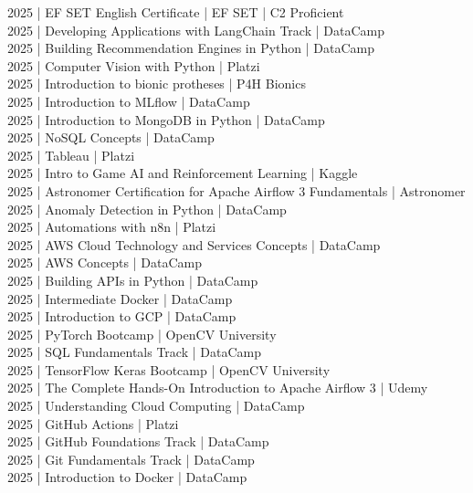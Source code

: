 {
2025 | EF SET English Certificate | EF SET | C2 Proficient \\
2025 | Developing Applications with LangChain Track | DataCamp \\
2025 | Building Recommendation Engines in Python | DataCamp \\
2025 | Computer Vision with Python | Platzi \\
2025 | Introduction to bionic protheses | P4H Bionics \\
2025 | Introduction to MLflow | DataCamp \\
2025 | Introduction to MongoDB in Python | DataCamp \\
2025 | NoSQL Concepts | DataCamp \\
2025 | Tableau | Platzi \\
2025 | Intro to Game AI and Reinforcement Learning | Kaggle \\
2025 | Astronomer Certification for Apache Airflow 3 Fundamentals | Astronomer \\
2025 | Anomaly Detection in Python | DataCamp \\
2025 | Automations with n8n | Platzi \\
2025 | AWS Cloud Technology and Services Concepts | DataCamp \\
2025 | AWS Concepts | DataCamp \\
2025 | Building APIs in Python | DataCamp \\
2025 | Intermediate Docker | DataCamp \\
2025 | Introduction to GCP | DataCamp \\
2025 | PyTorch Bootcamp | OpenCV University \\
2025 | SQL Fundamentals Track | DataCamp \\
2025 | TensorFlow Keras Bootcamp | OpenCV University \\
2025 | The Complete Hands-On Introduction to Apache Airflow 3 | Udemy \\
2025 | Understanding Cloud Computing | DataCamp \\
2025 | GitHub Actions | Platzi \\
2025 | GitHub Foundations Track | DataCamp \\
2025 | Git Fundamentals Track | DataCamp \\
2025 | Introduction to Docker | DataCamp \\
}
